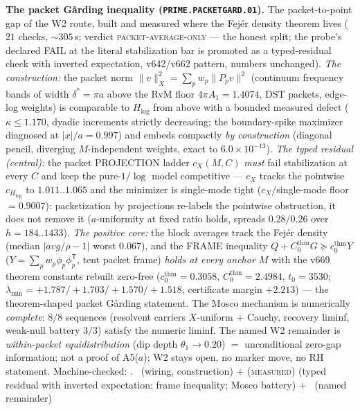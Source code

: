 \documentclass[11pt,a4paper]{article}
\theoremstyle{definition}
\begin{document}
\par\smallskip\noindent\textbf{The packet G\aa rding inequality
(\texttt{PRIME.PACKETGARD.01}).}
The packet-to-point gap of the W2 route, built and measured where
the Fej\'er density theorem lives ($21$ checks, ${\sim}305$\,s;
verdict \textsc{packet-average-only} --- the honest split; the
probe's declared FAIL at the literal stabilization bar is promoted
as a typed-residual check with inverted expectation, v642/v662
pattern, numbers unchanged).  \emph{The construction:} the packet
norm $\|v\|_X^2=\sum_p w_p\|P_p v\|^2$ (continuum frequency bands of
width $\delta^*=\pi a$ above the RvM floor $4\pi A_1=1.4074$, DST
packets, edge-log weights) is comparable to $H_{\log}$ from above
with a bounded measured defect ($\kappa\le1.170$, dyadic increments
strictly decreasing; the boundary-spike maximizer diagnosed at
$|x|/a=0.997$) and embeds compactly \emph{by construction} (diagonal
pencil, diverging $M$-independent weights, exact to
$6.0\times10^{-13}$).  \emph{The typed residual (central):} the
packet PROJECTION ladder $c_X(M,C)$ \emph{must} fail stabilization
at every $C$ and keep the pure-$1/\log$ model competitive --- $c_X$
tracks the pointwise $c_{H_{\log}}$ to $1.011..1.065$ and the
minimizer is single-mode tight ($c_X/$single-mode floor $=0.9007$):
packetization by projections re-labels the pointwise obstruction, it
does not remove it ($a$-uniformity at fixed ratio holds, spreads
$0.28/0.26$ over $h=184..1433$).  \emph{The positive core:} the
block averages track the Fej\'er density (median $|avg/\rho-1|$
worst $0.067$), and the FRAME inequality
$Q+C_0^{\mathrm{thm}}G\succeq c_0^{\mathrm{thm}}Y$
($Y=\sum_p w_p\phi_p\phi_p^{\mathsf T}$, tent packet frame)
\emph{holds at every anchor $M$} with the v669 theorem constants
rebuilt zero-free ($c_0^{\mathrm{thm}}=0.3058$,
$C_0^{\mathrm{thm}}=2.4984$, $t_0=3530$;
$\lambda_{\min}=+1.787/+1.703/+1.570/+1.518$, certificate margin
$+2.213$) --- the theorem-shaped packet G\aa rding statement.  The
Mosco mechanism is numerically \emph{complete}: $8/8$ sequences
(resolvent carriers $X$-uniform $+$ Cauchy, recovery liminf,
weak-null battery $3/3$) satisfy the numeric liminf.  The named W2
remainder is \emph{within-packet equidistribution} (dip depth
$\theta_1\to0.20$) $=$ unconditional zero-gap information; not a
proof of A5($a$); W2 stays open, no marker move, no RH statement.
Machine-checked: .
\mE\ (wiring, construction) $+$ (\textsc{measured}) (typed residual
with inverted expectation; frame inequality; Mosco battery) $+$
\mC\ (named remainder)
\par\smallskip
\end{document}
